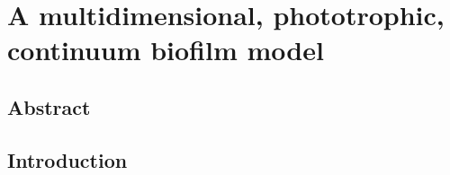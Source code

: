 \chapter[A multidimensional, phototrophic, continuum biofilm model]{A multidimensional, phototrophic, continuum biofilm model}
\label{chap:ch4}	%
\pagestyle{headings}

\section*{Abstract}

\section{Introduction}


